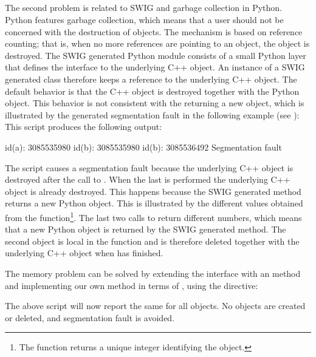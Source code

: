 \subsection{}
The second problem is related to SWIG and garbage collection in Python.
Python features garbage collection, which means that a user should not be
concerned with the destruction of objects. The mechanism is based on
reference counting; that is, when no more references are pointing to an
object, the object is destroyed. The SWIG generated Python module consists
of a small Python layer that defines the interface to the underlying C++
object. An instance of a SWIG generated class therefore keeps a reference
to the underlying C++ object. The default behavior is that the C++ object is destroyed together 
with the Python object. This behavior is not consistent with the
 returning a new object, which is illustrated 
by the generated segmentation fault in the following example 
(see ):
This script produces the following output:
\begin{python}
id(a): 3085535980
id(b): 3085535980
id(b): 3085536492
Segmentation fault
\end{python}
The script causes a segmentation fault because the underlying C++ object is
destroyed after the call to . When the last  is
performed the underlying C++ object is already destroyed. This happens
because the SWIG generated  method returns a new Python
object. This is illustrated by the different values obtained from the
 function\footnote{The  function returns a
unique integer identifying the object.}. The last two calls to 
return different numbers, which means that a new Python object is
returned by the SWIG generated  method. The second
 object is local in the  function and 
is therefore deleted together with the underlying C++ object when  has finished.  

The memory problem can be solved by extending the interface with
an  method and implementing our own  method in
terms of , using the  directive:
The above script will now report the same  for all objects. 
No objects are created or deleted, and segmentation fault is avoided.

